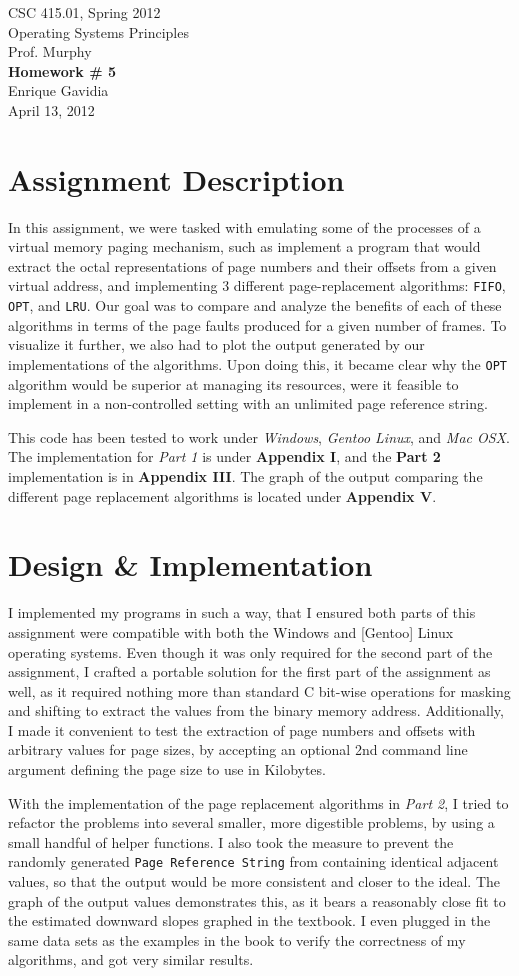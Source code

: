 \documentclass[12pt]{article}
\def \name       {Enrique Gavidia}
\def \coursenum  {CSC 415.01}
\def \coursename {Operating Systems Principles}
\def \instructor {Prof. Murphy}
\def \semester   {Spring 2012}
\def \assignment {Homework \# 5}
\def \duedate    {April 13, 2012}
\newcommand {\makecover} {
  \begin{titlepage}
    \begin{center}
      \LARGE{\coursenum, \semester \\ \coursename}\\
      \Large{\instructor}\\
      \vfill
      \textbf{\Huge \assignment}\\
      \vfill
      \Large{\name}\\
      \large{\duedate}
    \end{center}
  \end{titlepage}
}
\begin{document}
\makecover

\section*{Assignment Description}
In this assignment, we were tasked with emulating some of the processes of a virtual memory paging mechanism, such as implement a program 
that would extract the octal representations of page numbers and their offsets from a given virtual address, and implementing
3 different page-replacement algorithms: \texttt{FIFO}, \texttt{OPT}, and \texttt{LRU}.  Our goal was to compare and analyze the benefits
of each of these algorithms in terms of the page faults produced for a given number of frames. To visualize it further, we also had to plot
the output generated by our implementations of the algorithms. Upon doing this, it became clear why the \texttt{OPT} algorithm would be superior
at managing its resources, were it feasible to implement in a non-controlled setting with an unlimited page reference string.


This code has been tested to work under \textsl{Windows}, \textsl{Gentoo Linux}, and \textsl{Mac OSX}.
The implementation for \textsl{Part 1} is under \textbf{Appendix I}, and the \textbf{Part 2} implementation is in \textbf{Appendix III}. 
The graph of the output comparing the different page replacement algorithms is located under \textbf{Appendix V}.


\section*{Design \& Implementation}
I implemented my programs in such a way, that I ensured both parts of this assignment were compatible with both the Windows and [Gentoo] Linux operating systems.
Even though it was only required for the second part of the assignment, I crafted a portable solution for the first part of the assignment as well, as it required
nothing more than standard C bit-wise operations for masking and shifting to extract the values from the binary memory address.  Additionally, I made it convenient
to test the extraction of page numbers and offsets with arbitrary values for page sizes, by accepting an optional 2nd command line argument defining the page size
to use in Kilobytes.

With the implementation of the page replacement algorithms in \textsl{Part 2}, I tried to refactor the problems into several smaller, more digestible problems, by 
using a small handful of helper functions. I also took the measure to prevent the randomly generated \texttt{Page Reference String} from containing identical 
adjacent values, so that the output would be more consistent and closer to the ideal. The graph of the output values demonstrates this, as it bears a reasonably 
close fit to the estimated downward slopes graphed in the textbook.  I even plugged in the same data sets as the examples in the book to verify the correctness of 
my algorithms, and got very similar results.
\end{document}
